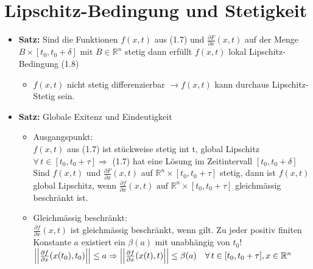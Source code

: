 \documentclass[ngerman]{tudscrreprt}
\begin{document}
\section{Lipschitz-Bedingung und Stetigkeit}
\begin{itemize}
\item \textbf{Satz:}
Sind die Funktionen $f(x,t)$ aus (1.7) und $\frac{\partial F}{\partial x} (x, t)$ auf der Menge $B\times \left[t_0, t_0 + \delta \right] \text{ mit } B \in \mathbb{R}^n$ stetig dann erfüllt $f(x,t)$ lokal Lipschitz-Bedingung (1.8) 
\begin{itemize}
\item $f(x,t)$ nicht stetig differenzierbar $\rightarrow f(x,t)$ kann durchaus Lipschitz-Stetig sein.
\end{itemize}
\item \textbf{Satz:} Globale Exitenz und Eindeutigkeit
\begin{itemize}
\item Ausgangspunkt: \\$f(x,t)$ aus (1.7) ist stückweise stetig int t, global Lipschitz $\forall \, t \in [t_0 , t_0 + \tau] \Rightarrow$ (1.7) hat eine Lösung im Zeitintervall $[t_0 , t_0 + \delta]$\\
Sind $f(x,t)$ und $\frac{\partial F}{\partial x} (x,t) $ auf $\mathbb{R}^n \times [t_0, t_0 + \tau] $ stetig, dann ist $f(x,t) $ global Lipschitz, wenn $\frac{\partial f}{\partial x} (x,t) \text{ auf } \mathbb{R}^n \times [ t_0 , t_0+\tau] $ gleichmässig beschränkt ist.
\item Gleichmässig beschränkt:\\ $\frac{\partial f}{\partial x} (x,t) $ ist gleichmässig beschränkt, wenn gilt. Zu jeder positiv finiten Konstante $a$ existiert ein $\beta(a) $ mit unabhängig von $t_0$!\\
$
\left|\left| \frac{\partial f}{\partial x}(x(t_0) , t_0) \right| \right| \leq a \Rightarrow
\left|\left| \frac{\partial f}{\partial x} (x(t) , t) \right|\right| \leq \beta(a) \quad \forall \, t\in[t_0, t_0+\tau], x\in \mathbb{R}^n\\
$
\end{itemize}
\end{itemize}
\end{document}
